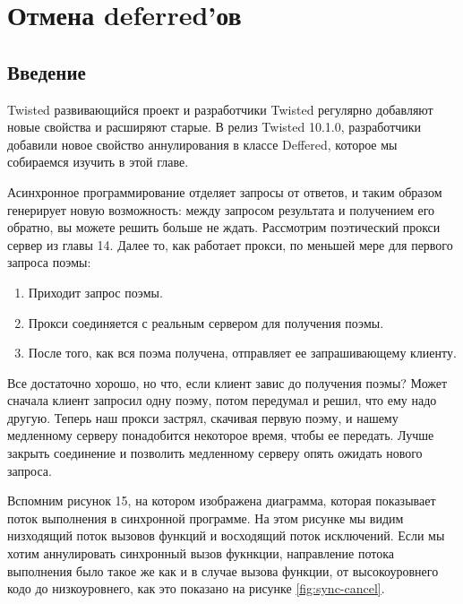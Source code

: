 
\section{Отмена deferred'ов\label{sec:part19}}


\subsection{Введение}


Twisted развивающийся проект и разработчики Twisted регулярно 
добавляют новые свойства и расширяют старые. В релиз Twisted 10.1.0, 
разработчики добавили новое свойство аннулирования в классе Deffered, 
которое мы собираемся изучить в этой главе.


Асинхронное программирование отделяет запросы от ответов, и 
таким образом генерирует новую возможность: между запросом  
результата и получением его обратно, вы можете решить больше 
не ждать. Рассмотрим поэтический прокси сервер из главы 14. 
Далее то, как работает прокси, по меньшей мере для первого 
запроса поэмы:

\begin{enumerate}
\item Приходит запрос поэмы.
\item Прокси соединяется с реальным сервером для получения поэмы.
\item После того, как вся поэма получена, отправляет ее запрашивающему клиенту.
\end{enumerate}


Все достаточно хорошо, но что, если клиент завис до получения 
поэмы? Может сначала клиент запросил одну поэму, потом передумал и 
решил, что ему надо другую. Теперь наш прокси застрял, скачивая первую 
поэму, и нашему медленному серверу понадобится некоторое время, чтобы 
ее передать. Лучше закрыть соединение и позволить медленному серверу 
опять ожидать нового запроса.


Вспомним рисунок 15, на котором изображена диаграмма, 
которая показывает поток выполнения в синхронной программе. 
На этом рисунке мы видим низходящий поток вызовов функций и 
восходящий поток исключений. Если мы хотим аннулировать 
синхронный вызов фукнкции, направление потока выполнения 
было такое же как и в случае вызова функции, от высокоуровнего 
кодо до низкоуровнего, как это показано на рисунке \ref{fig:sync-cancel}.

